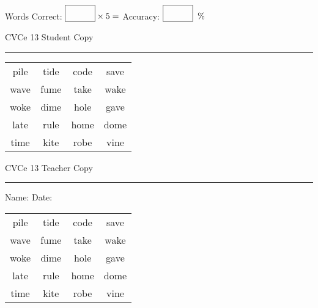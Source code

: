 \documentclass{memoir}
\begin{document}
\small

Words Correct: $\fbox{\phantom{\huge 100}} \times 5 = $ Accuracy: $\fbox{\phantom{\huge 100}}\;\; \%$ 

\vfill

\newpage


\footnotesize \noindent
CVCe 13 \hfill Student Copy
\smallskip
\hrule

\Large

\setlength{\tabcolsep}{14pt}
\def\arraystretch{2}

{\selectfont


\begin{vplace}[0.5]
\begin{center}
\begin{tabular}{cccc}
pile & tide & code & save \\
wave & fume & take & wake \\
woke & dime & hole & gave \\
late & rule & home & dome \\
time & kite & robe & vine \\
\end{tabular}
\end{center}
\end{vplace}

}

\newpage

\footnotesize \noindent
CVCe 13 \hfill Teacher Copy
\smallskip
\hrule

\small

\vfill

\noindent
Name: \underline{\hspace{1.75in}} \hfill Date: \underline{\hspace{1in}}

\Large

{\selectfont


\begin{vplace}[0.5]
\begin{center}
\begin{tabular}{cccc}
pile & tide & code & save \\
wave & fume & take & wake \\
woke & dime & hole & gave \\
late & rule & home & dome \\
time & kite & robe & vine \\
\end{tabular}
\end{center}
\end{vplace}



}
\end{document}
